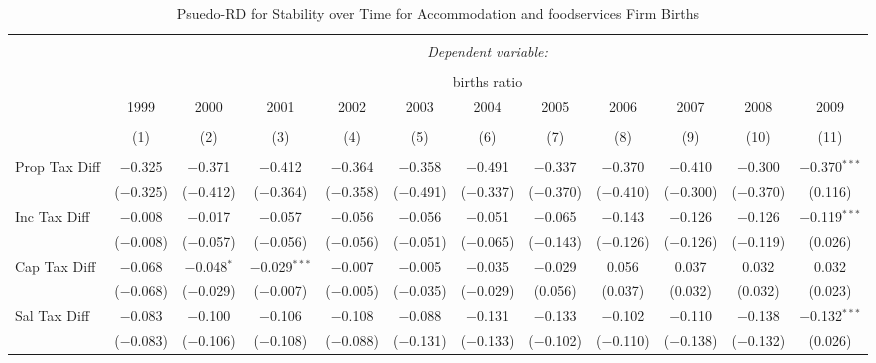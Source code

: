 
\begin{table}[!htbp] \centering 
  \caption{Psuedo-RD for Stability over Time for  Accommodation and foodservices Firm Births} 
  \label{72year} 
\small 
\begin{tabular}{@{\extracolsep{5pt}}lccccccccccc} 
\\[-1.8ex]\hline 
\hline \\[-1.8ex] 
 & \multicolumn{11}{c}{\textit{Dependent variable:}} \\ 
\cline{2-12} 
\\[-1.8ex] & \multicolumn{11}{c}{births ratio} \\ 
 & 1999 & 2000 & 2001 & 2002 & 2003 & 2004 & 2005 & 2006 & 2007 & 2008 & 2009 \\ 
\\[-1.8ex] & (1) & (2) & (3) & (4) & (5) & (6) & (7) & (8) & (9) & (10) & (11)\\ 
\hline \\[-1.8ex] 
 Prop Tax Diff & $-$0.325 & $-$0.371 & $-$0.412 & $-$0.364 & $-$0.358 & $-$0.491 & $-$0.337 & $-$0.370 & $-$0.410 & $-$0.300 & $-$0.370$^{***}$ \\ 
  & ($-$0.325) & ($-$0.412) & ($-$0.364) & ($-$0.358) & ($-$0.491) & ($-$0.337) & ($-$0.370) & ($-$0.410) & ($-$0.300) & ($-$0.370) & (0.116) \\ 
  Inc Tax Diff & $-$0.008 & $-$0.017 & $-$0.057 & $-$0.056 & $-$0.056 & $-$0.051 & $-$0.065 & $-$0.143 & $-$0.126 & $-$0.126 & $-$0.119$^{***}$ \\ 
  & ($-$0.008) & ($-$0.057) & ($-$0.056) & ($-$0.056) & ($-$0.051) & ($-$0.065) & ($-$0.143) & ($-$0.126) & ($-$0.126) & ($-$0.119) & (0.026) \\ 
  Cap Tax Diff & $-$0.068 & $-$0.048$^{*}$ & $-$0.029$^{***}$ & $-$0.007 & $-$0.005 & $-$0.035 & $-$0.029 & 0.056 & 0.037 & 0.032 & 0.032 \\ 
  & ($-$0.068) & ($-$0.029) & ($-$0.007) & ($-$0.005) & ($-$0.035) & ($-$0.029) & (0.056) & (0.037) & (0.032) & (0.032) & (0.023) \\ 
  Sal Tax Diff & $-$0.083 & $-$0.100 & $-$0.106 & $-$0.108 & $-$0.088 & $-$0.131 & $-$0.133 & $-$0.102 & $-$0.110 & $-$0.138 & $-$0.132$^{***}$ \\ 
  & ($-$0.083) & ($-$0.106) & ($-$0.108) & ($-$0.088) & ($-$0.131) & ($-$0.133) & ($-$0.102) & ($-$0.110) & ($-$0.138) & ($-$0.132) & (0.026) \\ 

\end{tabular}
\end{table}
